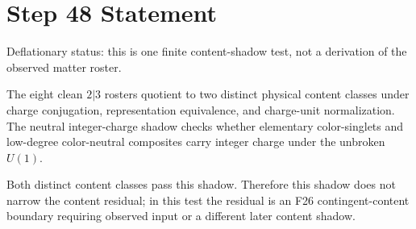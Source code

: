 \documentclass[11pt]{article}
\begin{document}
\section*{Step 48 Statement}
Deflationary status: this is one finite content-shadow test, not a derivation of the observed matter roster.

The eight clean \(2|3\) rosters quotient to two distinct physical content classes under charge conjugation, representation equivalence, and charge-unit normalization. The neutral integer-charge shadow checks whether elementary color-singlets and low-degree color-neutral composites carry integer charge under the unbroken \(U(1)\).

Both distinct content classes pass this shadow. Therefore this shadow does not narrow the content residual; in this test the residual is an F26 contingent-content boundary requiring observed input or a different later content shadow.
\end{document}
